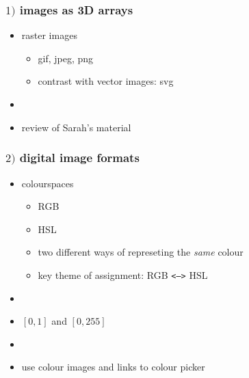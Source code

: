 \documentclass[english,14pt]{beamer}
\begin{document}

\begin{frame}[fragile]

\frametitle{$1)$ images as 3D arrays}

\begin{itemize}


	\item raster images
	\begin{itemize}
		\item gif, jpeg, png
		\item contrast with vector images: svg
	\end{itemize}

	\item[]
	
	\item review of Sarah's material
\end{itemize}

\end{frame}


\begin{frame}[fragile]

\frametitle{$2)$ digital image formats}

\begin{itemize}

	\item colourspaces
	\begin{itemize}
		\item RGB
		\item HSL
		\item two different ways of represeting the \emph{same} colour
		\item key theme of assignment: RGB \texttt{<-->} HSL
	\end{itemize}
	\item[]
	\item $[0,1]$ and $[0,255]$
	\item[]
	\item use colour images and links to colour picker
\end{itemize}

\end{frame}
\end{document}

